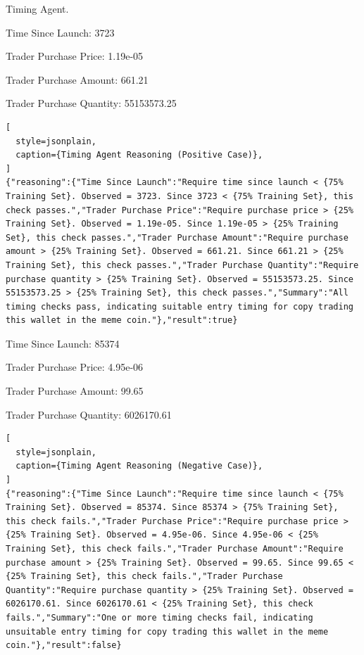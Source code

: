 \begin{reasoning}[label={cot:timing_agent}]{Timing Agent.}

Time Since Launch: 3723

Trader Purchase Price: 1.19e-05

Trader Purchase Amount: 661.21

Trader Purchase Quantity: 55153573.25

\begin{lstlisting}[
  style=jsonplain,
  caption={Timing Agent Reasoning (Positive Case)},
]
{"reasoning":{"Time Since Launch":"Require time since launch < {75% Training Set}. Observed = 3723. Since 3723 < {75% Training Set}, this check passes.","Trader Purchase Price":"Require purchase price > {25% Training Set}. Observed = 1.19e-05. Since 1.19e-05 > {25% Training Set}, this check passes.","Trader Purchase Amount":"Require purchase amount > {25% Training Set}. Observed = 661.21. Since 661.21 > {25% Training Set}, this check passes.","Trader Purchase Quantity":"Require purchase quantity > {25% Training Set}. Observed = 55153573.25. Since 55153573.25 > {25% Training Set}, this check passes.","Summary":"All timing checks pass, indicating suitable entry timing for copy trading this wallet in the meme coin."},"result":true}

\end{lstlisting}

Time Since Launch: 85374

Trader Purchase Price: 4.95e-06

Trader Purchase Amount: 99.65

Trader Purchase Quantity: 6026170.61


\begin{lstlisting}[
  style=jsonplain,
  caption={Timing Agent Reasoning (Negative Case)},
]
{"reasoning":{"Time Since Launch":"Require time since launch < {75% Training Set}. Observed = 85374. Since 85374 > {75% Training Set}, this check fails.","Trader Purchase Price":"Require purchase price > {25% Training Set}. Observed = 4.95e-06. Since 4.95e-06 < {25% Training Set}, this check fails.","Trader Purchase Amount":"Require purchase amount > {25% Training Set}. Observed = 99.65. Since 99.65 < {25% Training Set}, this check fails.","Trader Purchase Quantity":"Require purchase quantity > {25% Training Set}. Observed = 6026170.61. Since 6026170.61 < {25% Training Set}, this check fails.","Summary":"One or more timing checks fail, indicating unsuitable entry timing for copy trading this wallet in the meme coin."},"result":false}
\end{lstlisting}
\end{reasoning}